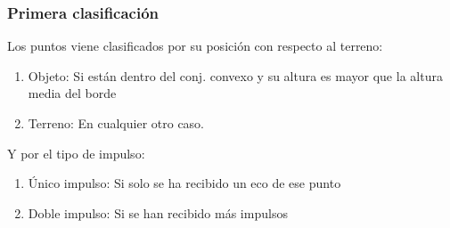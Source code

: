 \begin{frame}
  \frametitle{Primera clasificación}
Los puntos viene clasificados por su posición con respecto al terreno: \pause
\begin{enumerate}
 \item \alert{Objeto}: Si están dentro del conj. convexo y su altura es mayor que la altura media del borde
 \item \alert{Terreno}: En cualquier otro caso.
\end{enumerate}

\pause
Y por el tipo de impulso:
\begin{enumerate}
 \item \alert{\'Unico impulso}: Si solo se ha recibido un eco de ese punto
 \item \alert{Doble impulso}: Si se han recibido más impulsos
\end{enumerate}
\end{frame}
